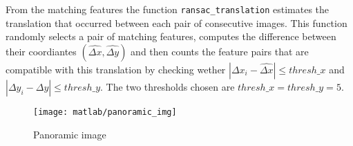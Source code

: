 \documentclass[a4paper,oneside]{article}
\newcommand{\inlinecode}[1]{\lstinline[basicstyle=\ttfamily,keywordstyle={},stringstyle={},commentstyle={\itshape}]{#1}}
\newcommand{\abs}[1]{\left|#1\right|}
\begin{document}
From the matching features the function
\inlinecode{ransac_translation} estimates the translation that
occurred between each pair of consecutive images. This function
randomly selects a pair of matching features, computes the difference
between their coordiantes $(\hat{\Delta x}, \hat{\Delta y})$ and then
counts the feature pairs that are compatible with this translation by
checking wether $\abs{\Delta x_i - \hat{\Delta x}} \leq
\mathit{thresh\_x}$ and $\abs{\Delta y_i - \hat{\Delta y}} \leq
\mathit{thresh\_y}$. The two thresholds chosen are $\mathit{thresh\_x}
= \mathit{thresh\_y} = 5$.


\begin{figure}[htbp]
  \centering
  \texttt{[image: matlab/panoramic\_img]}
  \caption{Panoramic image}
  \label{fig:panoramic}
\end{figure}
\end{document}
